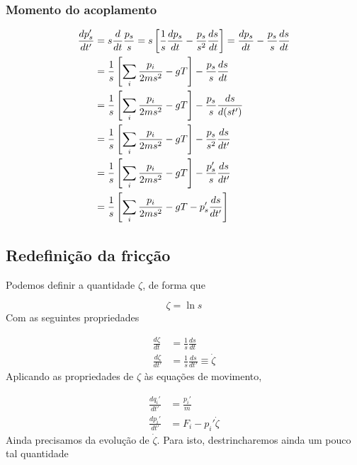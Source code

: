 \documentclass[twoside, a4paper]{article}
\newcommand{\deri}[2]{\frac{d #1}{d #2}}
\begin{document}
\subsubsection*{Momento do acoplamento}

\begin{align}
	\deri{p_s'}{t'} &=  s \deri{}{t} \frac{p_s}{s} = s \left[ \frac{1}{s}\deri{p_s}{t} - \frac{p_s}{s^2}\deri{s}{t}\right] = 
	  \deri{p_s}{t} - \frac{p_s}{s}\deri{s}{t} \notag \\
	  &= \frac{1}{s} \left[ \sum_i \frac{p_i}{2ms^2} - gT \right] - \frac{p_s}{s}\deri{s}{t} \notag \\
	  &= \frac{1}{s} \left[ \sum_i \frac{p_i}{2ms^2} - gT \right] - \frac{p_s}{s}\deri{s}{(st')} \notag \\
	  &= \frac{1}{s} \left[ \sum_i \frac{p_i}{2ms^2} - gT \right] - \frac{p_s}{s^2}\deri{s}{t'} \notag \\
	  &= \frac{1}{s} \left[ \sum_i \frac{p_i}{2ms^2} - gT \right] - \frac{p_s'}{s}\deri{s}{t'} \notag \\
	  &= \frac{1}{s} \left[ \sum_i \frac{p_i}{2ms^2} - gT- p_s'\deri{s}{t'} \right]  
\end{align}

\subsection{Redefinição da fricção}

Podemos definir a quantidade $\zeta$, de forma que 

\begin{equation}
	\zeta = \ln s
\end{equation}
Com as seguintes propriedades

\begin{subequations}
\begin{align}
	\deri{\zeta}{t} &= \frac{1}{s}\deri{s}{t}\\
	\deri{\zeta}{t'} &= \frac{1}{s}\deri{s}{t'} \equiv \dot{\zeta}
\end{align}
\end{subequations}
Aplicando as propriedades de $\zeta$ às equações de movimento,

\begin{subequations}
\begin{align}
	\deri{q_i'}{t'} &= \frac{p_i'}{m} \\
	\deri{p_i'}{t'} &= F_i - p_i' \dot{\zeta}
\end{align}
\end{subequations}
Ainda precisamos da evolução de $\dot{\zeta}$. Para isto, destrincharemos ainda um pouco tal quantidade
\end{document}
